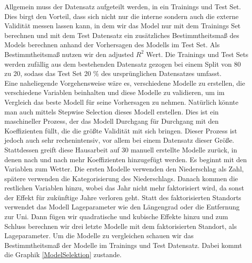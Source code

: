 \documentclass[a4paper,12pt]{thesis}
\begin{document}
Allgemein muss der Datensatz aufgeteilt werden, in ein Trainings und Test Set. Dies birgt den Vorteil, dass sich nicht nur die interne sondern auch die externe Validität messen lassen kann, in dem wir das Model nur mit dem Trainings Set berechnen und mit dem Test Datensatz ein zusätzliches Bestimmtheitsmaß des Models berechnen anhand der Vorhersagen des Modells im Test Set. Als Bestimmtheitsmaß nutzen wir den adjusted $R^2$ Wert. Die Trainings und Test Sets werden zufällig aus dem bestehenden Datensatz gezogen bei einem Split von 80 zu 20, sodass das Test Set 20 \% des ursprünglichen Datensatzes umfasst.\\
Eine naheliegende Vorgehensweise wäre es, verschiedene Modelle zu erstellen, die verschiedene Variablen beinhalten und diese Modelle zu validieren, um im Vergleich das beste Modell für seine Vorhersagen zu nehmen. Natürlich könnte man auch mittels Stepwise Selection dieses Modell erstellen. Dies ist ein maschineller Prozess, der das Modell Durchgang für Durchgang mit den Koeffizienten füllt, die die größte Validität mit sich bringen. Dieser Prozess ist jedoch auch sehr rechenintensiv, vor allem bei einem Datensatz dieser Größe. Stattdessen greift diese Hausarbeit auf 30 manuell erstellte Modelle zurück, in denen nach und nach mehr Koeffizienten hinzugefügt werden. Es beginnt mit den Variablen zum Wetter. Die ersten Modelle verwenden den Niederschlag als Zahl, spätere verwenden die Kategorisierung des Niederschlags. Danach kommen die restlichen Variablen hinzu, wobei das Jahr nicht mehr faktorisiert wird, da sonst der Effekt für zukünftige Jahre verloren geht. Statt des faktorisierten Standorts verwendet das Modell Lageparameter wie den Längengrad oder die Entfernung zur Uni. Dann fügen wir quadratische und kubische Effekte hinzu und zum Schluss berechnen wir drei letzte Modelle mit dem faktorisierten Standort, als Lageparameter. Um die Modelle zu vergleichen schauen wir das Bestimmtheitsmaß der Modelle im Trainings und Test Datensatz. Dabei kommt die Graphik \ref{ModelSelektion} zustande.
\end{document}
